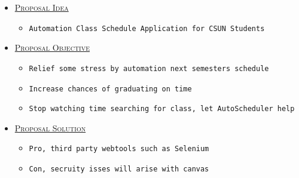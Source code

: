 \begin{itemize}
  \item[] \centering\large\textsc{\underline{Proposal Idea}}
  \begin{itemize}
    \item \normalsize\texttt{Automation Class Schedule Application for CSUN Students} 
  \end{itemize}
\end{itemize}
\vfill
\begin{itemize}
  \item[] \centering\large\textsc{\underline{Proposal Objective}}
  \begin{itemize}
    \item \normalsize\texttt{Relief some stress by automation next semesters schedule}
    \item \normalsize\texttt{Increase chances of graduating on time}
    \item \normalsize\texttt{Stop watching time searching for class, let AutoScheduler help} 
  \end{itemize}
\end{itemize}
\vfill
\begin{itemize}
  \item[] \centering\large\textsc{\underline{Proposal Solution}}
  \begin{itemize}
    \item \normalsize\texttt{Pro, third party webtools such as Selenium}
    \item \normalsize\texttt{Con, secruity isses will arise with canvas}
  \end{itemize} 
\end{itemize}
\clearpage